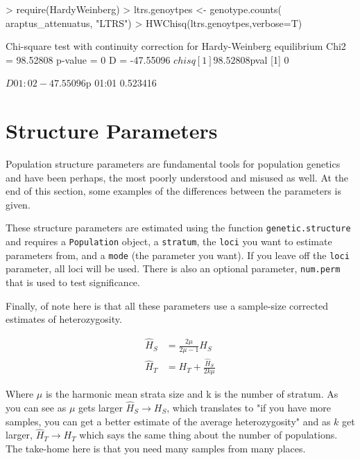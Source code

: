 \documentclass[letterpaper,twoside,openany]{book}
\begin{document}
\begin{Schunk}
\begin{Sinput}
> require(HardyWeinberg)
> ltrs.genoytpes <- genotype.counts( araptus_attenuatus, "LTRS")
> HWChisq(ltrs.genoytpes,verbose=T)
\end{Sinput}
\begin{Soutput}
Chi-square test with continuity correction for Hardy-Weinberg equilibrium
Chi2 =  98.52808 p-value =  0 D =  -47.55096 
$chisq
[1] 98.52808

$pval
[1] 0

$D
    01:02 
-47.55096 

$p
   01:01 
0.523416 
\end{Soutput}
\end{Schunk}


\section{Structure Parameters}

Population structure parameters are fundamental tools for population genetics and have been perhaps, the most poorly understood and misused as well.  At the end of this section, some examples of the differences between the parameters is given.

These structure parameters are estimated using the function \texttt{genetic.structure} and requires a \texttt{Population} object, a \texttt{stratum}, the \texttt{loci} you want to estimate parameters from, and a \texttt{mode} (the parameter you want).  If you leave off the \texttt{loci} parameter, all loci will be used.  There is also an optional parameter, \texttt{num.perm} that is used to test significance.  

Finally, of note here is that all these parameters use a sample-size corrected estimates of heterozygosity.

\begin{align*}
	\hat{H}_S & = \frac{2\mu}{2\mu-1}H_S \\
	\hat{H}_T & =  H_T + \frac{\hat{H}_S}{2k\mu} 
\end{align*}

Where $\mu$ is the harmonic mean strata size and k is the number of stratum.  As you can see as $\mu$ gets larger $\hat{H}_S \to H_S$, which translates to "if you have more samples, you can get a better estimate of the average heterozygosity" and as $k$ get larger, $\hat{H}_T \to H_T$ which says the same thing about the number of populations.  The take-home here is that you need many samples from many places.
\end{document}
